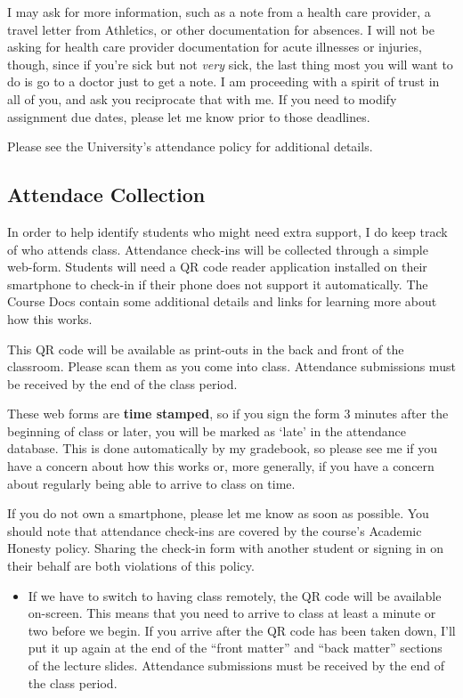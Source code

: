 \documentclass[
]{book}
\newenvironment{rmdblock}[1]
  {\begin{shaded*}
  \begin{itemize}
  \renewcommand{\labelitemi}{
    \raisebox{-.7\height}[0pt][0pt]{
      {\setkeys{Gin}{width=3em,keepaspectratio}\texttt{[image: images/\#1]}}
    }
  }
  \item
  }
  {
  \end{itemize}
  \end{shaded*}
  }
\newenvironment{rmdwarning}
  {\begin{rmdblock}{warning}}
  {\end{rmdblock}}
\begin{document}
I may ask for more information, such as a note from a health care provider, a travel letter from Athletics, or other documentation for absences. I will not be asking for health care provider documentation for acute illnesses or injuries, though, since if you're sick but not \emph{very} sick, the last thing most you will want to do is go to a doctor just to get a note. I am proceeding with a spirit of trust in all of you, and ask you reciprocate that with me. If you need to modify assignment due dates, please let me know prior to those deadlines.

Please see the University's attendance policy for additional details.

\hypertarget{attendace-collection}{%
\subsection{Attendace Collection}\label{attendace-collection}}

In order to help identify students who might need extra support, I do keep track of who attends class. Attendance check-ins will be collected through a simple web-form. Students will need a QR code reader application installed on their smartphone to check-in if their phone does not support it automatically. The Course Docs contain some additional details and links for learning more about how this works.

This QR code will be available as print-outs in the back and front of the classroom. Please scan them as you come into class. Attendance submissions must be received by the end of the class period.

These web forms are \textbf{time stamped}, so if you sign the form 3 minutes after the beginning of class or later, you will be marked as `late' in the attendance database. This is done automatically by my gradebook, so please see me if you have a concern about how this works or, more generally, if you have a concern about regularly being able to arrive to class on time.

If you do not own a smartphone, please let me know as soon as possible. You should note that attendance check-ins are covered by the course's Academic Honesty policy. Sharing the check-in form with another student or signing in on their behalf are both violations of this policy.

\begin{rmdwarning}
If we have to switch to having class remotely, the QR code will be
available on-screen. This means that you need to arrive to class at
least a minute or two before we begin. If you arrive after the QR code
has been taken down, I'll put it up again at the end of the ``front
matter'' and ``back matter'' sections of the lecture slides. Attendance
submissions must be received by the end of the class period.
\end{rmdwarning}
\end{document}
